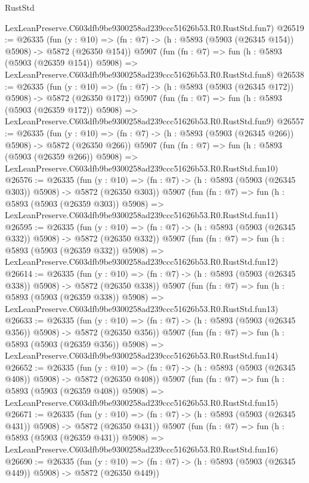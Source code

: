 \begin{lexlean}{RustStd}
\begin{coremodule}
    LexLeanPreserve.C603dfb9be9300258ad239ccc51626b53.R0.RustStd.fun7)
@26519 := @26335
    (fun (y : @10) => (fn : @7) -> (h : @5893 (@5903 (@26345 @154)) @5908) -> @5872 (@26350 @154))
    @5907
    (fun (fn : @7) =>
    fun (h : @5893 (@5903 (@26359 @154)) @5908) =>
    LexLeanPreserve.C603dfb9be9300258ad239ccc51626b53.R0.RustStd.fun8)
@26538 := @26335
    (fun (y : @10) => (fn : @7) -> (h : @5893 (@5903 (@26345 @172)) @5908) -> @5872 (@26350 @172))
    @5907
    (fun (fn : @7) =>
    fun (h : @5893 (@5903 (@26359 @172)) @5908) =>
    LexLeanPreserve.C603dfb9be9300258ad239ccc51626b53.R0.RustStd.fun9)
@26557 := @26335
    (fun (y : @10) => (fn : @7) -> (h : @5893 (@5903 (@26345 @266)) @5908) -> @5872 (@26350 @266))
    @5907
    (fun (fn : @7) =>
    fun (h : @5893 (@5903 (@26359 @266)) @5908) =>
    LexLeanPreserve.C603dfb9be9300258ad239ccc51626b53.R0.RustStd.fun10)
@26576 := @26335
    (fun (y : @10) => (fn : @7) -> (h : @5893 (@5903 (@26345 @303)) @5908) -> @5872 (@26350 @303))
    @5907
    (fun (fn : @7) =>
    fun (h : @5893 (@5903 (@26359 @303)) @5908) =>
    LexLeanPreserve.C603dfb9be9300258ad239ccc51626b53.R0.RustStd.fun11)
@26595 := @26335
    (fun (y : @10) => (fn : @7) -> (h : @5893 (@5903 (@26345 @332)) @5908) -> @5872 (@26350 @332))
    @5907
    (fun (fn : @7) =>
    fun (h : @5893 (@5903 (@26359 @332)) @5908) =>
    LexLeanPreserve.C603dfb9be9300258ad239ccc51626b53.R0.RustStd.fun12)
@26614 := @26335
    (fun (y : @10) => (fn : @7) -> (h : @5893 (@5903 (@26345 @338)) @5908) -> @5872 (@26350 @338))
    @5907
    (fun (fn : @7) =>
    fun (h : @5893 (@5903 (@26359 @338)) @5908) =>
    LexLeanPreserve.C603dfb9be9300258ad239ccc51626b53.R0.RustStd.fun13)
@26633 := @26335
    (fun (y : @10) => (fn : @7) -> (h : @5893 (@5903 (@26345 @356)) @5908) -> @5872 (@26350 @356))
    @5907
    (fun (fn : @7) =>
    fun (h : @5893 (@5903 (@26359 @356)) @5908) =>
    LexLeanPreserve.C603dfb9be9300258ad239ccc51626b53.R0.RustStd.fun14)
@26652 := @26335
    (fun (y : @10) => (fn : @7) -> (h : @5893 (@5903 (@26345 @408)) @5908) -> @5872 (@26350 @408))
    @5907
    (fun (fn : @7) =>
    fun (h : @5893 (@5903 (@26359 @408)) @5908) =>
    LexLeanPreserve.C603dfb9be9300258ad239ccc51626b53.R0.RustStd.fun15)
@26671 := @26335
    (fun (y : @10) => (fn : @7) -> (h : @5893 (@5903 (@26345 @431)) @5908) -> @5872 (@26350 @431))
    @5907
    (fun (fn : @7) =>
    fun (h : @5893 (@5903 (@26359 @431)) @5908) =>
    LexLeanPreserve.C603dfb9be9300258ad239ccc51626b53.R0.RustStd.fun16)
@26690 := @26335
    (fun (y : @10) => (fn : @7) -> (h : @5893 (@5903 (@26345 @449)) @5908) -> @5872 (@26350 @449))

\end{coremodule}
\end{lexlean}
